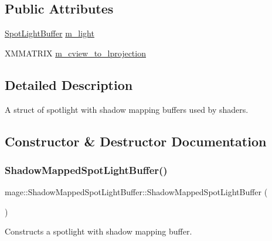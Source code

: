 \subsection*{Public Attributes}
\begin{DoxyCompactItemize}
\item 
\hyperlink{structmage_1_1_spot_light_buffer}{Spot\+Light\+Buffer} \hyperlink{structmage_1_1_shadow_mapped_spot_light_buffer_a629e46c0d512d0b31f2467e7a84a2a47}{m\+\_\+light}
\item 
X\+M\+M\+A\+T\+R\+IX \hyperlink{structmage_1_1_shadow_mapped_spot_light_buffer_a99a1760604d6fc9605c186baf61cb8d2}{m\+\_\+cview\+\_\+to\+\_\+lprojection}
\end{DoxyCompactItemize}


\subsection{Detailed Description}
A struct of spotlight with shadow mapping buffers used by shaders. 

\subsection{Constructor \& Destructor Documentation}
\hypertarget{structmage_1_1_shadow_mapped_spot_light_buffer_a6d4633c3f9466589c99ab55c11daf940}{}\label{structmage_1_1_shadow_mapped_spot_light_buffer_a6d4633c3f9466589c99ab55c11daf940} 
\subsubsection{\texorpdfstring{Shadow\+Mapped\+Spot\+Light\+Buffer()}{ShadowMappedSpotLightBuffer()}\hspace{0.1cm}{\footnotesize\ttfamily [1/3]}}
{\footnotesize\ttfamily mage\+::\+Shadow\+Mapped\+Spot\+Light\+Buffer\+::\+Shadow\+Mapped\+Spot\+Light\+Buffer (\begin{DoxyParamCaption}{ }\end{DoxyParamCaption})\hspace{0.3cm}{\ttfamily [noexcept]}}

Constructs a spotlight with shadow mapping buffer. \hypertarget{structmage_1_1_shadow_mapped_spot_light_buffer_a78f9b207eca1b61bd433b5a6c731e549}{}\label{structmage_1_1_shadow_mapped_spot_light_buffer_a78f9b207eca1b61bd433b5a6c731e549} 
